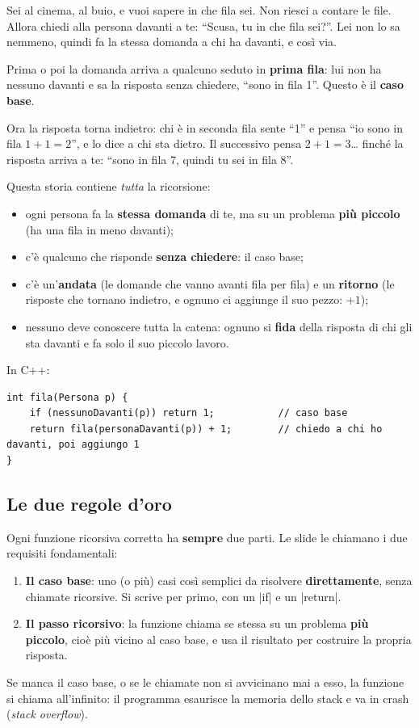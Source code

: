 \begin{analogia}
Sei al cinema, al buio, e vuoi sapere in che fila sei. Non riesci a contare le
file. Allora chiedi alla persona davanti a te: ``Scusa, tu in che fila sei?''.
Lei non lo sa nemmeno, quindi fa la stessa domanda a chi ha davanti, e così via.

Prima o poi la domanda arriva a qualcuno seduto in \textbf{prima fila}: lui non ha
nessuno davanti e sa la risposta senza chiedere, ``sono in fila 1''. Questo è il
\textbf{caso base}.

Ora la risposta torna indietro: chi è in seconda fila sente ``1'' e pensa ``io
sono in fila $1 + 1 = 2$'', e lo dice a chi sta dietro. Il successivo pensa
$2 + 1 = 3$\ldots{} finché la risposta arriva a te: ``sono in fila 7, quindi tu sei
in fila 8''.
\end{analogia}

Questa storia contiene \emph{tutta} la ricorsione:
\begin{itemize}
  \item ogni persona fa la \textbf{stessa domanda} di te, ma su un problema
        \textbf{più piccolo} (ha una fila in meno davanti);
  \item c'è qualcuno che risponde \textbf{senza chiedere}: il caso base;
  \item c'è un'\textbf{andata} (le domande che vanno avanti fila per fila) e un
        \textbf{ritorno} (le risposte che tornano indietro, e ognuno ci aggiunge il suo
        pezzo: $+1$);
  \item nessuno deve conoscere tutta la catena: ognuno si \textbf{fida} della
        risposta di chi gli sta davanti e fa solo il suo piccolo lavoro.
\end{itemize}

In C++:
\begin{lstlisting}
int fila(Persona p) {
    if (nessunoDavanti(p)) return 1;           // caso base
    return fila(personaDavanti(p)) + 1;        // chiedo a chi ho davanti, poi aggiungo 1
}
\end{lstlisting}

\subsection*{Le due regole d'oro}

Ogni funzione ricorsiva corretta ha \textbf{sempre} due parti. Le slide le
chiamano i due requisiti fondamentali:
\begin{enumerate}
  \item \textbf{Il caso base}: uno (o più) casi così semplici da risolvere
        \textbf{direttamente}, senza chiamate ricorsive. Si scrive per primo, con un
        \cc|if| e un \cc|return|.
  \item \textbf{Il passo ricorsivo}: la funzione chiama se stessa su un problema
        \textbf{più piccolo}, cioè più vicino al caso base, e usa il risultato per
        costruire la propria risposta.
\end{enumerate}
Se manca il caso base, o se le chiamate non si avvicinano mai a esso, la
funzione si chiama all'infinito: il programma esaurisce la memoria dello stack e va
in crash (\emph{stack overflow}).

